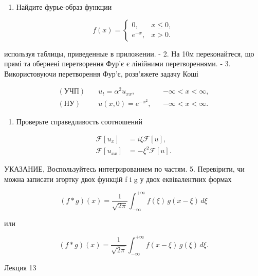 \documentclass[
  ukrainian,
]{article}
\providecommand{\tightlist}{%
  \setlength{\itemsep}{0pt}\setlength{\parskip}{0pt}}
\begin{document}
\begin{enumerate}
\def\labelenumi{\arabic{enumi}.}
\tightlist
\item
  Найдите фурье-образ функции
\end{enumerate}

\[
f(x)=
\begin{cases}
0, & x \le 0, \\
e^{-x}, & x > 0.
\end{cases}
\]

используя таблицы, приведенные в приложении. - 2. На 10м переконайтеся,
що прямі та обернені перетворення Фур'є є лінійними перетвореннями. - 3.
Використовуючи перетворення Фур'є, розв'яжете задачу Коші

\[
\begin{aligned}
(\text{УЧП})\quad & u_t = \alpha^2 u_{xx}, && -\infty < x < \infty,\\
(\text{НУ})\quad & u(x,0)=e^{-x^2}, && -\infty < x < \infty.
\end{aligned}
\]

\begin{enumerate}
\def\labelenumi{\arabic{enumi}.}
\setcounter{enumi}{3}
\tightlist
\item
  Проверьте справедливость соотношений
\end{enumerate}

\[
\begin{aligned}
\mathcal{F}\left[u_{x}\right] &= i\xi \mathcal{F}\left[u\right], \\
\mathcal{F}\left[u_{xx}\right] &= -\xi^{2} \mathcal{F}\left[u\right].
\end{aligned}
\]

УКАЗАНИЕ, Воспользуйтесь интегрированием по частям. 5. Перевірити, чи
можна записати згортку двох функцій f і g у двох еквівалентних формах

\[
(f * g)(x) = \frac{1}{\sqrt{2\pi}} \int_{-\infty}^{+\infty} f(\xi)\, g(x - \xi)\, d\xi
\]

или

\[
(f * g)(x) = \frac{1}{\sqrt{2\pi}} \int_{-\infty}^{+\infty} f(x-\xi)\, g(\xi)\, d\xi.
\]

Лекция 13
\end{document}
